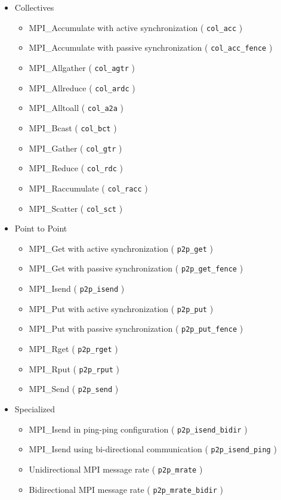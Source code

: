 \documentclass[10pt,a4paper]{report}
\begin{document}
\begin{itemize}
\item{Collectives}
\begin{itemize}
    \item{MPI\_Accumulate with active synchronization ( \texttt{col\_acc} )}
    \item{MPI\_Accumulate with passive synchronization ( \texttt{col\_acc\_fence} )}
	\item{MPI\_Allgather ( \texttt{col\_agtr} )}
	\item{MPI\_Allreduce ( \texttt{col\_ardc} )}
	\item{MPI\_Alltoall ( \texttt{col\_a2a} )}
	\item{MPI\_Bcast ( \texttt{col\_bct} )}
	\item{MPI\_Gather ( \texttt{col\_gtr} )}
	\item{MPI\_Reduce ( \texttt{col\_rdc} )}
	\item{MPI\_Raccumulate ( \texttt{col\_racc} )}
	\item{MPI\_Scatter ( \texttt{col\_sct} )}
\end{itemize}
\item{Point to Point}
\begin{itemize}
	\item{MPI\_Get with active synchronization ( \texttt{p2p\_get} )}
	\item{MPI\_Get with passive synchronization ( \texttt{p2p\_get\_fence} )}
	\item{MPI\_Isend ( \texttt{p2p\_isend} )}
	\item{MPI\_Put with active synchronization ( \texttt{p2p\_put} )}
	\item{MPI\_Put with passive synchronization ( \texttt{p2p\_put\_fence} )}
	\item{MPI\_Rget ( \texttt{p2p\_rget} )}
	\item{MPI\_Rput ( \texttt{p2p\_rput} )}
	\item{MPI\_Send ( \texttt{p2p\_send} )}
\end{itemize}
\item{Specialized}
\begin{itemize}
	\item{MPI\_Isend in ping-ping configuration ( \texttt{p2p\_isend\_bidir} )}
	\item{MPI\_Isend using bi-directional communication ( \texttt{p2p\_isend\_ping} )}
	\item{Unidirectional MPI message rate ( \texttt{p2p\_mrate} )}
	\item{Bidirectional MPI message rate ( \texttt{p2p\_mrate\_bidir} )}
\end{itemize}
\end{itemize}
\end{document}
